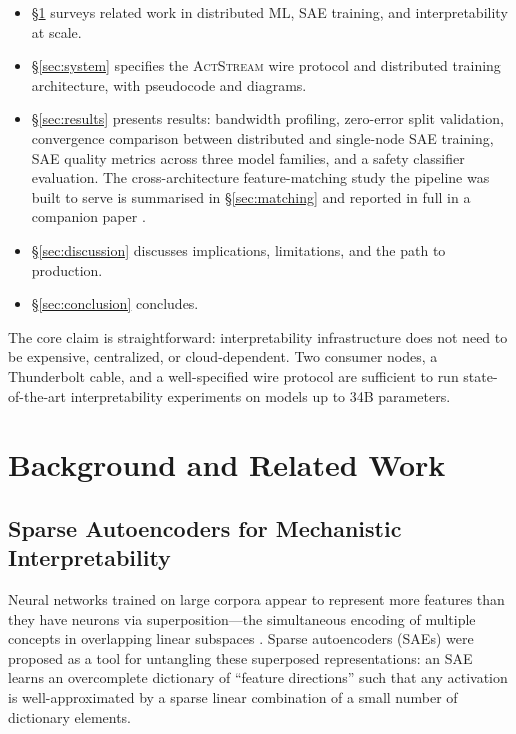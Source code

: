 \documentclass[11pt]{article}
\newcommand{\actstream}{\textsc{ActStream}}
\begin{document}
\begin{itemize}
\item \S\ref{sec:background} surveys related work in distributed ML, SAE training, and interpretability at scale.
\item \S\ref{sec:system} specifies the \actstream{} wire protocol and distributed training architecture, with pseudocode and diagrams.
\item \S\ref{sec:results} presents results: bandwidth profiling, zero-error split validation, convergence comparison between distributed and single-node SAE training, SAE quality metrics across three model families, and a safety classifier evaluation. The cross-architecture feature-matching study the pipeline was built to serve is summarised in \S\ref{sec:matching} and reported in full in a companion paper \citep{melton2026saecomparison}.
\item \S\ref{sec:discussion} discusses implications, limitations, and the path to production.
\item \S\ref{sec:conclusion} concludes.
\end{itemize}

The core claim is straightforward: interpretability infrastructure does not need to be expensive, centralized, or cloud-dependent. Two consumer nodes, a Thunderbolt cable, and a well-specified wire protocol are sufficient to run state-of-the-art interpretability experiments on models up to 34B parameters.

\section{Background and Related Work}
\label{sec:background}

\subsection{Sparse Autoencoders for Mechanistic Interpretability}

Neural networks trained on large corpora appear to represent more features than they have neurons via superposition---the simultaneous encoding of multiple concepts in overlapping linear subspaces \citep{elhage2022superposition}. Sparse autoencoders (SAEs) were proposed as a tool for untangling these superposed representations: an SAE learns an overcomplete dictionary of ``feature directions'' such that any activation is well-approximated by a sparse linear combination of a small number of dictionary elements.
\end{document}
